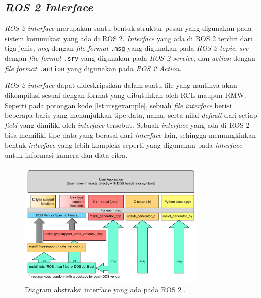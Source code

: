 \subsection{\emph{ROS 2 Interface}}
\label{subsec:ros2interface}

\emph{ROS 2 interface} merupakan suatu bentuk struktur pesan yang digunakan pada sistem komunikasi yang ada di ROS 2.
\emph{Interface} yang ada di ROS 2 terdiri dari tiga jenis,
  \emph{msg} dengan \emph{file format} \lstinline{.msg} yang digunakan pada \emph{ROS 2 topic},
  \emph{srv} dengan \emph{file format} \lstinline{.srv} yang digunakan pada \emph{ROS 2 service},
  dan \emph{action} dengan \emph{file format} \lstinline{.action} yang digunakan pada \emph{ROS 2 Action}.

\emph{ROS 2 interface} dapat dideskripsikan dalam suatu file yang nantinya akan dikompilasi sesuai dengan format yang dibutuhkan oleh RCL maupun RMW.
Seperti pada potongan kode \ref{lst:msgexample},
  sebuah \emph{file interface} berisi beberapa baris yang menunjukkan tipe data, nama, serta nilai \emph{default} dari setiap \emph{field} yang dimiliki oleh \emph{interface} tersebut.
Sebuah \emph{interface} yang ada di ROS 2 bisa memiliki tipe data yang berasal dari \emph{interface} lain,
  sehingga memungkinkan bentuk \emph{interface} yang lebih kompleks seperti yang digunakan pada \emph{interface} untuk informasi kamera dan data citra.

\begin{figure}
  \centering
  \includegraphics[width=0.8\textwidth,keepaspectratio]{gambar/diagram-interface-ros2.png}
  \caption{Diagram abstraksi interface yang ada pada ROS 2 \citep{url:ros2interfacesconcept}.}
  \label{fig:diagraminterfaceros2}
\end{figure}



